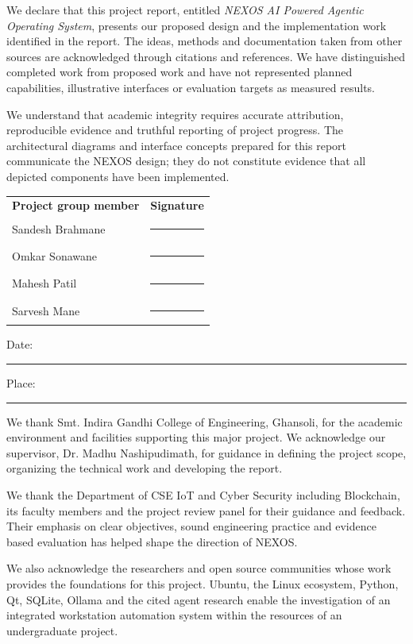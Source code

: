 We declare that this project report, entitled \emph{NEXOS AI Powered Agentic Operating System}, presents our proposed design and the implementation work identified in the report. The ideas, methods and documentation taken from other sources are acknowledged through citations and references. We have distinguished completed work from proposed work and have not represented planned capabilities, illustrative interfaces or evaluation targets as measured results.

We understand that academic integrity requires accurate attribution, reproducible evidence and truthful reporting of project progress. The architectural diagrams and interface concepts prepared for this report communicate the NEXOS design; they do not constitute evidence that all depicted components have been implemented.

\vspace{18mm}
\begin{tabularx}{\textwidth}{Y l}
\textbf{Project group member} & \textbf{Signature}\\[7mm]
Sandesh Brahmane & \rule{45mm}{0.4pt}\\[7mm]
Omkar Sonawane & \rule{45mm}{0.4pt}\\[7mm]
Mahesh Patil & \rule{45mm}{0.4pt}\\[7mm]
Sarvesh Mane & \rule{45mm}{0.4pt}
\end{tabularx}
\vfill
\noindent Date: \rule{35mm}{0.4pt}\hfill Place: \rule{45mm}{0.4pt}
\clearpage
{}
We thank Smt. Indira Gandhi College of Engineering, Ghansoli, for the academic environment and facilities supporting this major project. We acknowledge our supervisor, Dr. Madhu Nashipudimath, for guidance in defining the project scope, organizing the technical work and developing the report.

We thank the Department of CSE IoT and Cyber Security including Blockchain, its faculty members and the project review panel for their guidance and feedback. Their emphasis on clear objectives, sound engineering practice and evidence based evaluation has helped shape the direction of NEXOS.

We also acknowledge the researchers and open source communities whose work provides the foundations for this project. Ubuntu, the Linux ecosystem, Python, Qt, SQLite, Ollama and the cited agent research enable the investigation of an integrated workstation automation system within the resources of an undergraduate project.

